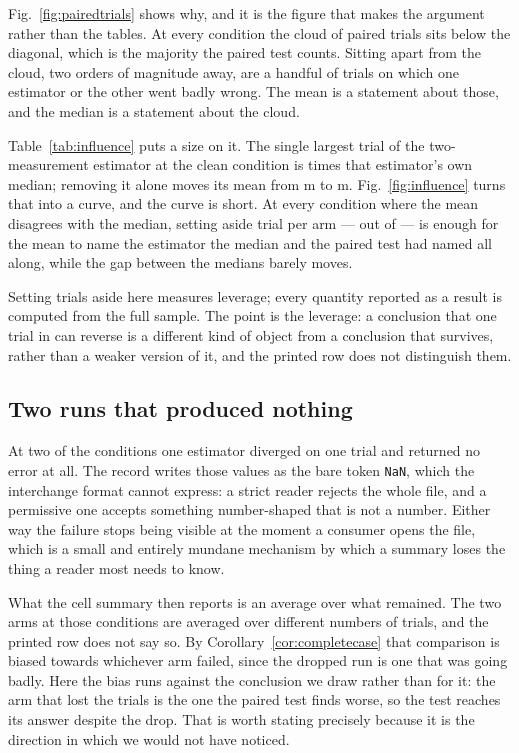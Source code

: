Fig.~\ref{fig:pairedtrials} shows why, and it is the figure that makes the
argument rather than the tables. At every condition the cloud of paired trials
sits below the diagonal, which is the majority the paired test counts. Sitting
apart from the cloud, two orders of magnitude away, are a handful of trials on
which one estimator or the other went badly wrong. The mean is a statement about
those, and the median is a statement about the cloud.

Table~\ref{tab:influence} puts a size on it. The single largest trial of the
two-measurement estimator at the clean condition is \CxCleanLeverage{} times
that estimator's own median; removing it alone moves its mean from
\CxCleanMeanFull{} m to \CxCleanMeanWithoutMax{} m. Fig.~\ref{fig:influence}
turns that into a curve, and the curve is short. At every condition where the
mean disagrees with the median, setting aside \CxFlipDepth{} trial per arm --- out
of \CxTrialsPerCondition{} --- is enough for the mean to name the estimator the
median and the paired test had named all along, while the gap between the
medians barely moves.

Setting trials aside here measures leverage; every quantity reported as a result
is computed from the full sample. The point is the leverage: a conclusion that
one trial in \CxTrialsPerCondition{} can reverse is a different kind of object
from a conclusion that survives, rather than a weaker version of it, and the
printed row does not distinguish them.

\subsection{Two runs that produced nothing}

At two of the conditions one estimator diverged on one trial and returned no
error at all. The record writes those \CxAbsentValues{} values as the bare token
\texttt{NaN}, which the interchange format cannot express: a strict reader
rejects the whole file, and a permissive one accepts something number-shaped
that is not a number. Either way the failure stops being visible at the moment a
consumer opens the file, which is a small and entirely mundane mechanism by
which a summary loses the thing a reader most needs to know.

What the cell summary then reports is an average over what remained. The two
arms at those conditions are averaged over different numbers of trials, and the
printed row does not say so. By
Corollary~\ref{cor:completecase} that comparison is biased towards whichever arm
failed, since the dropped run is one that was going badly. Here the bias runs
against the conclusion we draw rather than for it: the arm that lost the trials
is the one the paired test finds worse, so the test reaches its answer despite
the drop. That is worth stating precisely because it is the direction in which
we would not have noticed.

